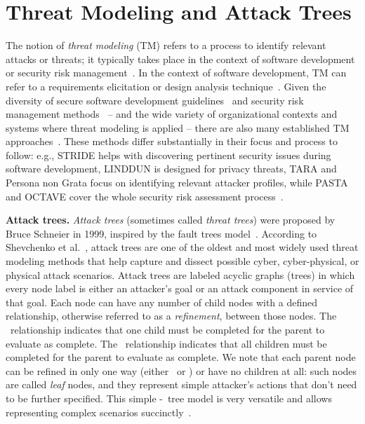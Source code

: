 
\section{Threat Modeling and Attack Trees}\label{sec:background}
The notion of \emph{threat modeling} (TM) refers to a process to identify relevant attacks or threats; it typically takes place in the context of software development or security risk management~\cite{xiong2019threat,tuma2018threat}. In the context of software development, TM can refer to a requirements elicitation or design analysis technique~\cite{shostack2008experiences}. Given the diversity of secure software development guidelines~\cite{kudriavtseva2022secure} and security risk management methods~\cite{gritzalis2018exiting} -- and the wide variety of organizational contexts and systems where threat modeling is applied -- there are also many established TM approaches~\cite{shevchenko2018threat,xiong2019threat,mitre2018tm,granata2024systematic,tatam2021review,tuma2018threat}. These methods differ substantially in their focus and process to follow: e.g., STRIDE helps with discovering pertinent security issues during software development, LINDDUN is designed for privacy threats, TARA and Persona non Grata focus on identifying relevant attacker profiles, while PASTA and OCTAVE cover the whole security risk assessment process~\cite{shevchenko2018threat,mitre2018tm}. 


\textbf{Attack trees.}
\emph{Attack trees} (sometimes called \emph{threat trees}) were proposed by Bruce Schneier in 1999, inspired by the fault trees model~\cite{schneierAttackTrees1999}. According to Shevchenko et al.~\cite{shevchenko2018threat}, attack trees are one of the oldest and most widely used threat modeling methods that help capture and dissect possible cyber, cyber-physical, or physical attack scenarios. Attack trees are labeled acyclic graphs (trees) in which every node label is either an attacker's goal or an attack component in service of that goal. Each node can have any number of child nodes with a defined relationship, otherwise referred to as a \emph{refinement}, between those nodes. The \OR\ relationship indicates that one child must be completed for the parent to evaluate as complete. The \AND\ relationship indicates that all children must be completed for the parent to evaluate as complete. We note that each parent node can be refined in only one way (either \AND\ or \OR) or have no children at all: such nodes are called \emph{leaf} nodes, and they represent simple attacker's actions that don't need to be further specified. This simple \AND-\OR\ tree model is very versatile and allows representing complex scenarios succinctly~\cite{schneierAttackTrees1999,mauwFoundationsAttackTrees2006,widel2019beyond}. 

